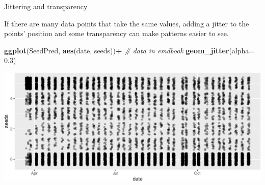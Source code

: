 \documentclass[
  ignorenonframetext,
]{beamer}
\newenvironment{Shaded}{\begin{snugshade}}{\end{snugshade}}
\newcommand{\CommentTok}[1]{\textcolor[rgb]{0.56,0.35,0.01}{\textit{#1}}}
\newcommand{\DataTypeTok}[1]{\textcolor[rgb]{0.13,0.29,0.53}{#1}}
\newcommand{\FloatTok}[1]{\textcolor[rgb]{0.00,0.00,0.81}{#1}}
\newcommand{\KeywordTok}[1]{\textcolor[rgb]{0.13,0.29,0.53}{\textbf{#1}}}
\newcommand{\NormalTok}[1]{#1}
\newcommand{\OperatorTok}[1]{\textcolor[rgb]{0.81,0.36,0.00}{\textbf{#1}}}
\newcommand{\StringTok}[1]{\textcolor[rgb]{0.31,0.60,0.02}{#1}}
\begin{document}
\begin{frame}[fragile]{Jittering and transparency}
\protect\hypertarget{jittering-and-transparency}{}

If there are many data points that take the same values, adding a jitter
to the points' position and some transparency can make patterns easier
to see.

\scriptsize

\begin{Shaded}
\begin{Highlighting}[]
\KeywordTok{ggplot}\NormalTok{(SeedPred, }\KeywordTok{aes}\NormalTok{(date, seeds))}\OperatorTok{+}\StringTok{  }\CommentTok{# data in emdbook}
\StringTok{  }\KeywordTok{geom_jitter}\NormalTok{(}\DataTypeTok{alpha=} \FloatTok{0.3}\NormalTok{)}
\end{Highlighting}
\end{Shaded}

\includegraphics{data_viz_files/figure-beamer/unnamed-chunk-9-1.pdf}

\end{frame}
\end{document}
